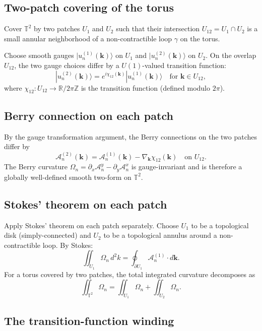 \documentclass[11pt,a4paper]{article}
\begin{document}
\subsection{Two-patch covering of the torus}

Cover $\mathbb{T}^2$ by two patches $U_1$ and $U_2$ such that their intersection $U_{12} = U_1 \cap U_2$ is a small annular neighborhood of a non-contractible loop $\gamma$ on the torus.

Choose smooth gauges $|u_n^{(1)}(\mathbf{k})\rangle$ on $U_1$ and $|u_n^{(2)}(\mathbf{k})\rangle$ on $U_2$. On the overlap $U_{12}$, the two gauge choices differ by a $U(1)$-valued transition function:
\[
|u_n^{(2)}(\mathbf{k})\rangle = e^{i\chi_{12}(\mathbf{k})}|u_n^{(1)}(\mathbf{k})\rangle \quad \text{for } \mathbf{k} \in U_{12},
\]
where $\chi_{12}: U_{12} \to \mathbb{R}/2\pi\mathbb{Z}$ is the transition function (defined modulo $2\pi$).

\subsection{Berry connection on each patch}

By the gauge transformation argument, the Berry connections on the two patches differ by
\[
\mathcal{A}_n^{(2)}(\mathbf{k}) = \mathcal{A}_n^{(1)}(\mathbf{k}) - \nabla_\mathbf{k}\chi_{12}(\mathbf{k}) \quad \text{on } U_{12}.
\]
The Berry curvature $\Omega_n = \partial_x\mathcal{A}_n^y - \partial_y\mathcal{A}_n^x$ is gauge-invariant and is therefore a globally well-defined smooth two-form on $\mathbb{T}^2$.

\subsection{Stokes' theorem on each patch}

Apply Stokes' theorem on each patch separately. Choose $U_1$ to be a topological disk (simply-connected) and $U_2$ to be a topological annulus around a non-contractible loop. By Stokes:
\[
\iint_{U_1}\Omega_n\, d^2k = \oint_{\partial U_1}\mathcal{A}_n^{(1)}\cdot d\mathbf{k}.
\]
For a torus covered by two patches, the total integrated curvature decomposes as
\[
\iint_{\mathbb{T}^2}\Omega_n = \iint_{U_1}\Omega_n + \iint_{U_2}\Omega_n.
\]

\subsection{The transition-function winding}
\end{document}
